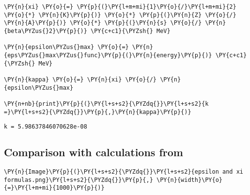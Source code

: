     \begin{tcolorbox}[breakable, size=fbox, boxrule=1pt, pad at break*=1mm,colback=cellbackground, colframe=cellborder]
\begin{Verbatim}[commandchars=\\\{\}]
\PY{n}{xi} \PY{o}{=} \PY{p}{(}\PY{l+m+mi}{1}\PY{o}{/}\PY{l+m+mi}{2} \PY{o}{*} \PY{n}{K}\PY{p}{)} \PY{o}{*} \PY{p}{(}\PY{n}{Z} \PY{o}{/} \PY{n}{A}\PY{p}{)} \PY{o}{*} \PY{p}{(}\PY{n}{s} \PY{o}{/} \PY{n}{beta\PYZus{}2}\PY{p}{)} \PY{c+c1}{\PYZsh{} MeV}

\PY{n}{epsilon\PYZus{}max} \PY{o}{=} \PY{n}{eps\PYZus{}max\PYZus{}func}\PY{p}{(}\PY{n}{energy}\PY{p}{)} \PY{c+c1}{\PYZsh{} MeV}

\PY{n}{kappa} \PY{o}{=} \PY{n}{xi} \PY{o}{/} \PY{n}{epsilon\PYZus{}max}

\PY{n+nb}{print}\PY{p}{(}\PY{l+s+s2}{\PYZdq{}}\PY{l+s+s2}{k =}\PY{l+s+s2}{\PYZdq{}}\PY{p}{,}\PY{n}{kappa}\PY{p}{)}
\end{Verbatim}
\end{tcolorbox}

    \begin{Verbatim}[commandchars=\\\{\}]
k = 5.98637846070628e-08
    \end{Verbatim}

    \hypertarget{comparison-with-calculations-from-httpsnap.nationalacademies.orgread20066chapter10189}{%
\subsection{Comparison with calculations from \cite{NAP20066} }\label{comparison-with-calculations-from-httpsnap.nationalacademies.orgread20066chapter10189}}

    \begin{tcolorbox}[breakable, size=fbox, boxrule=1pt, pad at break*=1mm,colback=cellbackground, colframe=cellborder]
\begin{Verbatim}[commandchars=\\\{\}]
\PY{n}{Image}\PY{p}{(}\PY{l+s+s2}{\PYZdq{}}\PY{l+s+s2}{epsilon and xi formulas.png}\PY{l+s+s2}{\PYZdq{}}\PY{p}{,} \PY{n}{width}\PY{o}{=}\PY{l+m+mi}{1000}\PY{p}{)}
\end{Verbatim}
\end{tcolorbox}
 
            
    
    \begin{center}
    \end{center}
    { \hspace*{\fill} \\}
    

